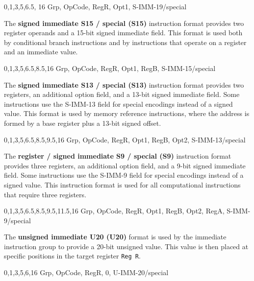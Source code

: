 \begin{center}
\drawInstrFormat
  	{0,1,3,5,6.5, 16}
  	{Grp, OpCode, RegR, Opt1, S-IMM-19/special}
\end{center}

The \textbf{signed immediate S15 / special (S15)} instruction format provides two register operands and a 15-bit signed immediate field. This format is used both by conditional branch instructions and by instructions that operate on a register and an immediate value.

\begin{center}
\drawInstrFormat
  	{0,1,3,5,6.5,8.5,16}
  	{Grp, OpCode, RegR, Opt1, RegB, S-IMM-15/special}
\end{center}

The \textbf{signed immediate S13 / special (S13)} instruction format provides two registers, an additional option field, and a 13-bit signed immediate field. Some instructions use the S-IMM-13 field for special encodings instead of a signed value. This format is used by memory reference instructions, where the address is formed by a base register plus a 13-bit signed offset.

\begin{center}

\drawInstrFormat
  	{0,1,3,5,6.5,8.5,9.5,16}
  	{Grp, OpCode, RegR, Opt1, RegB, Opt2, S-IMM-13/special}
\end{center}

The \textbf{register / signed immediate S9 / special (S9)} instruction format provides three registers, an additional option field, and a 9-bit signed immediate field. Some instructions use the S-IMM-9 field for special encodings instead of a signed value. This instruction format is used for all computational instructions that require three registers.

\begin{center}
\drawInstrFormat
  	{0,1,3,5,6.5,8.5,9.5,11.5,16}
  	{Grp, OpCode, RegR, Opt1, RegB, Opt2, RegA, S-IMM-9/special}
\end{center}

The \textbf{unsigned immediate U20 (U20)} format is used by the immediate instruction group to provide a 20-bit unsigned value. This value is then placed at specific positions in the target register \texttt{Reg R}.

\begin{center}
\drawInstrFormat
  	{0,1,3,5,6,16}
  	{Grp, OpCode, RegR, 0, U-IMM-20/special}
\end{center}

